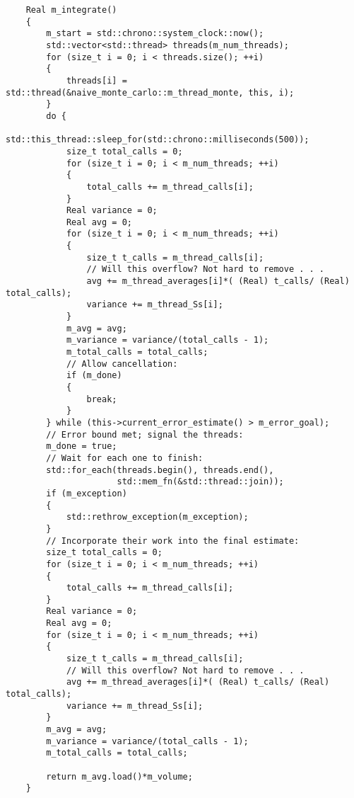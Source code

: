 \documentclass[landscape]{article}
\numberwithin{equation}{section}
\begin{document}
\begin{verbatim}
    Real m_integrate()
    {
        m_start = std::chrono::system_clock::now();
        std::vector<std::thread> threads(m_num_threads);
        for (size_t i = 0; i < threads.size(); ++i)
        {
            threads[i] = std::thread(&naive_monte_carlo::m_thread_monte, this, i);
        }
        do {
            std::this_thread::sleep_for(std::chrono::milliseconds(500));
            size_t total_calls = 0;
            for (size_t i = 0; i < m_num_threads; ++i)
            {
                total_calls += m_thread_calls[i];
            }
            Real variance = 0;
            Real avg = 0;
            for (size_t i = 0; i < m_num_threads; ++i)
            {
                size_t t_calls = m_thread_calls[i];
                // Will this overflow? Not hard to remove . . .
                avg += m_thread_averages[i]*( (Real) t_calls/ (Real) total_calls);
                variance += m_thread_Ss[i];
            }
            m_avg = avg;
            m_variance = variance/(total_calls - 1);
            m_total_calls = total_calls;
            // Allow cancellation:
            if (m_done)
            {
                break;
            }
        } while (this->current_error_estimate() > m_error_goal);
        // Error bound met; signal the threads:
        m_done = true;
        // Wait for each one to finish:
        std::for_each(threads.begin(), threads.end(),
                      std::mem_fn(&std::thread::join));
        if (m_exception)
        {
            std::rethrow_exception(m_exception);
        }
        // Incorporate their work into the final estimate:
        size_t total_calls = 0;
        for (size_t i = 0; i < m_num_threads; ++i)
        {
            total_calls += m_thread_calls[i];
        }
        Real variance = 0;
        Real avg = 0;
        for (size_t i = 0; i < m_num_threads; ++i)
        {
            size_t t_calls = m_thread_calls[i];
            // Will this overflow? Not hard to remove . . .
            avg += m_thread_averages[i]*( (Real) t_calls/ (Real) total_calls);
            variance += m_thread_Ss[i];
        }
        m_avg = avg;
        m_variance = variance/(total_calls - 1);
        m_total_calls = total_calls;

        return m_avg.load()*m_volume;
    }


\end{verbatim}
\end{document}
